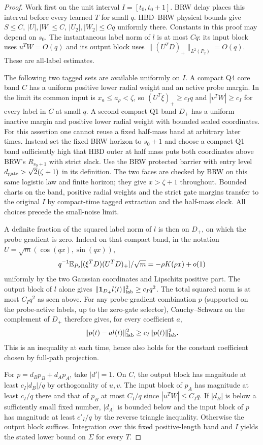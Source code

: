 \documentclass[11pt]{article}
\begin{document}
\begin{proof}
Work first on the unit interval $I=[t_0,t_0+1]$.
BRW delay places this interval before every learned $T$ for small
$q$. HBD--BRW physical bounds give $S\le C$, $|U|,|W|\le C$,
$|U_2|,|W_2|\le Cq$ uniformly there. Constants in this proof may
depend on $s_0$. The instantaneous label norm of $l$ is at most
$Cq$: its input block uses $u^TW=O(q)$ and its output block
uses $\|(U^TD)_+\|_{L^2(P_2)}=O(q)$. These are all-label estimates.

The following two tagged sets are available uniformly on $I$.
A compact Q4 core band $C$ has a uniform positive lower radial
weight and an active probe margin. In the limit its common input
is $x_a\le a_\rho<\zeta$, so $(U^T\xi)_+\ge c_I q$ and
$|v^TW|\ge c_I$ for every label in $C$ at small $q$.
A second compact Q1 band $D_+$ has a uniform inactive margin
and positive lower radial weight with bounded scaled coordinates.
For this assertion one cannot reuse a fixed half-mass band at
arbitrary later times. Instead set the fixed BRW horizon to
$s_0+1$ and choose a compact Q1 band sufficiently high that
HBD outer at half mass puts both coordinates above BRW's $R_{s_0+1}$
with strict slack. Use the BRW protected barrier with entry level
$d_{\rm gate}>\sqrt2(\zeta+1)$ in its definition. The two faces
are checked by BRW on this same logistic law and finite horizon;
they give $x>\zeta+1$ throughout. Bounded charts on the band,
positive radial weights and the strict gate margins transfer to
the original $I$ by compact-time tagged extraction and the half-mass
clock. All choices precede the small-noise limit.

A definite fraction of the squared label norm of $l$ is then on
$D_+$, on which the probe gradient is zero. Indeed on that compact
band, in the notation $U=\sqrt m(\cos(qx),\sin(qx))$,
\[
 q^{-1}\mathbb E_{P_2}[(\xi^TD)(U^TD)_+]/\sqrt m
           =-\rho K(\rho x)+o(1)
\]
uniformly by the two Gaussian coordinates and Lipschitz positive
part. The output block of $l$ alone gives
$\|{\bf1}_{D_+} l(t)\|_{\rm lab}^2\ge c_I q^2$.
The total squared norm is at most $C_I q^2$ as seen above.
For any probe-gradient combination $p$ (supported on the probe-active
labels, up to the zero-gate selector), Cauchy--Schwarz on the
complement of $D_+$ therefore gives, for every coefficient $a$,
\[
 \|p(t)-a l(t)\|_{\rm lab}^2\ge c_I\|p(t)\|_{\rm lab}^2 .
\]
This is an inequality at each time, hence also holds for the
constant coefficient chosen by full-path projection.

For $p=d_B p_B+d_A p_A$, take $|d'|=1$.
On $C$, the output block has magnitude at least $c_I|d_B|/q$
by orthogonality of $u,v$. The input block of $p_A$ has magnitude
at least $c_I/q$ there and that of $p_B$ at most $C_I/q$ since
$|u^TW|\le C_Iq$. If $|d_B|$ is below a sufficiently small fixed
number, $|d_A|$ is bounded below and the input block of $p$ has
magnitude at least $c'_I/q$ by the reverse triangle inequality.
Otherwise the output block suffices. Integration over this fixed
positive-length band and $I$ yields the stated lower bound on
$\Sigma$ for every $T$.


\end{proof}
\end{document}
